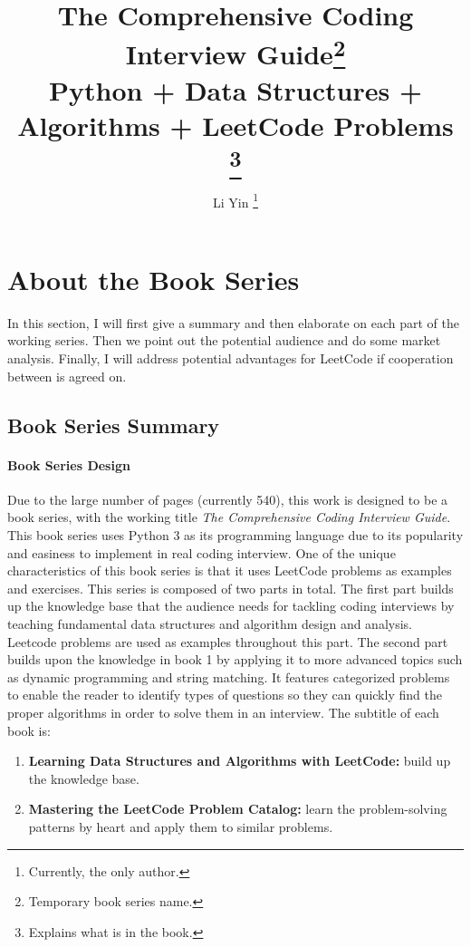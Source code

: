 \documentclass[12pt]{article}
\title{The Comprehensive Coding
Interview Guide\footnote{Temporary book series name.}\\ \normalsize  Python + Data Structures + Algorithms + LeetCode Problems \footnote{Explains what is in the book.}}
\author{Li Yin \footnote{Currently, the only author.}}
\begin{document}
\maketitle

\tableofcontents
\section{About the Book Series}
In this section, I will first give a summary and then elaborate on each part of the working series.  Then we point out the potential audience and do some market analysis. Finally, I will address potential advantages for LeetCode if cooperation between is agreed on. 
\subsection{Book Series Summary}
\paragraph{Book Series Design} Due to the large number of pages (currently 540), this work is designed to be a book series, with the working title \textit{The Comprehensive Coding Interview Guide}. This book series uses Python 3 as its programming language due to its popularity and easiness to implement in real coding interview. One of the unique characteristics of this book series is that it uses LeetCode problems as examples and exercises. This series is composed of two parts in total. The first part builds up the knowledge base that the audience needs for tackling coding interviews by teaching fundamental data structures and algorithm design and analysis. Leetcode problems are used as examples throughout this part.  The second part builds upon the knowledge in book 1 by applying it to more advanced topics such as dynamic programming and string matching. It features categorized problems to enable the reader to identify types of questions so they can quickly find the proper algorithms in order to solve them in an interview. The subtitle of each book is:
\begin{enumerate}
    \item \textbf{Learning Data Structures and Algorithms with LeetCode:} build up the knowledge base.
    \item \textbf{Mastering the LeetCode Problem Catalog:} learn the problem-solving patterns by heart and apply them to similar problems. 
\end{enumerate}
\end{document}
